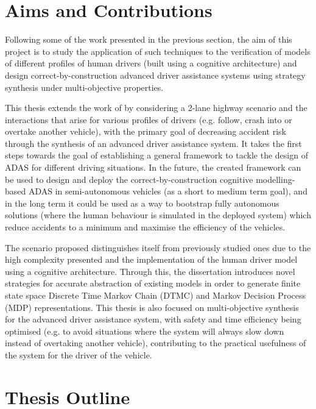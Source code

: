 \section{Aims and Contributions}

Following some of the work presented in the previous section, the aim of this project is to study the application of such techniques to the verification of models of different profiles of human drivers (built using a cognitive architecture) and design correct-by-construction advanced driver assistance systems using strategy synthesis under multi-objective properties. 

This thesis extends the work of \cite{games, lam, salvucci_1} by considering a 2-lane highway scenario and the interactions that arise for various profiles of drivers (e.g. follow, crash into or overtake another vehicle), with the primary goal of decreasing accident risk through the synthesis of an advanced driver assistance system. It takes the first steps towards the goal of establishing a general framework to tackle the design of ADAS for different driving situations. In the future, the created framework can be used to design and deploy the correct-by-construction cognitive modelling-based ADAS in semi-autonomous vehicles (as a short to medium term goal), and in the long term it could be used as a way to bootstrap fully autonomous solutions (where the human behaviour is simulated in the deployed system) which reduce accidents to a minimum and maximise the efficiency of the vehicles.

The scenario proposed distinguishes itself from previously studied ones due to the high complexity presented and the implementation of the human driver model using a cognitive architecture. Through this, the dissertation  introduces novel strategies for accurate abstraction of existing models in order to generate finite state space Discrete Time Markov Chain (DTMC) and Markov Decision Process (MDP) representations. This thesis is also focused on multi-objective synthesis for the advanced driver assistance system, with safety and time efficiency being optimised (e.g. to avoid situations where the system will always slow down instead of overtaking another vehicle), contributing to the practical usefulness of the system for the driver of the vehicle. 

\section{Thesis Outline}

